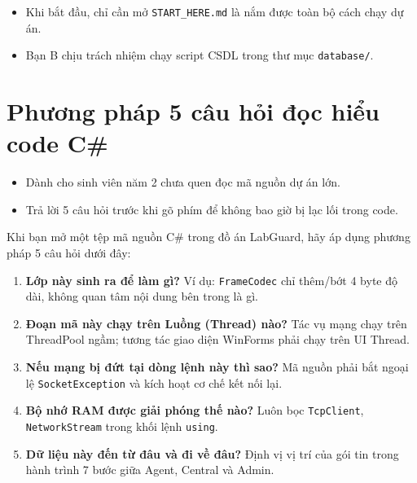 \documentclass[12pt,a4paper]{article}
\begin{document}
\begin{takeawaybox}
\begin{itemize}[leftmargin=1.5em, itemsep=1pt]
  \item Khi bắt đầu, chỉ cần mở \texttt{START\_HERE.md} là nắm được toàn bộ cách chạy dự án.
  \item Bạn B chịu trách nhiệm chạy script CSDL trong thư mục \texttt{database/}.
\end{itemize}
\end{takeawaybox}

\section{Phương pháp 5 câu hỏi đọc hiểu code C\#}

\begin{summarybox}
\begin{itemize}[leftmargin=1.5em, itemsep=1pt]
  \item Dành cho sinh viên năm 2 chưa quen đọc mã nguồn dự án lớn.
  \item Trả lời 5 câu hỏi trước khi gõ phím để không bao giờ bị lạc lối trong code.
\end{itemize}
\end{summarybox}

Khi bạn mở một tệp mã nguồn C\# trong đồ án LabGuard, hãy áp dụng phương pháp 5 câu hỏi dưới đây:
\begin{enumerate}
  \item \textbf{Lớp này sinh ra để làm gì?} Ví dụ: \texttt{FrameCodec} chỉ thêm/bớt 4 byte độ dài, không quan tâm nội dung bên trong là gì.
  \item \textbf{Đoạn mã này chạy trên Luồng (Thread) nào?} Tác vụ mạng chạy trên ThreadPool ngầm; tương tác giao diện WinForms phải chạy trên UI Thread.
  \item \textbf{Nếu mạng bị đứt tại dòng lệnh này thì sao?} Mã nguồn phải bắt ngoại lệ \texttt{SocketException} và kích hoạt cơ chế kết nối lại.
  \item \textbf{Bộ nhớ RAM được giải phóng thế nào?} Luôn bọc \texttt{TcpClient}, \texttt{NetworkStream} trong khối lệnh \texttt{using}.
  \item \textbf{Dữ liệu này đến từ đâu và đi về đâu?} Định vị vị trí của gói tin trong hành trình 7 bước giữa Agent, Central và Admin.
\end{enumerate}
\end{document}
